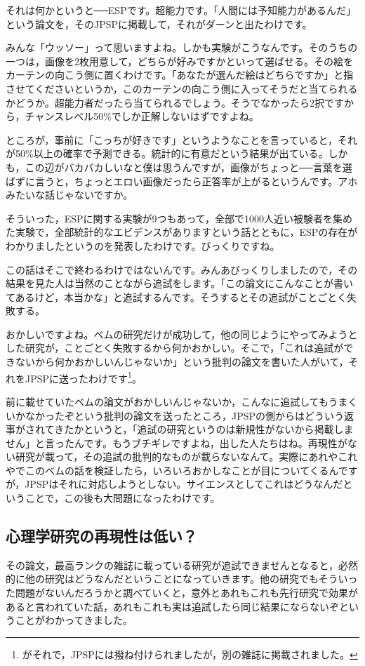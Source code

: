 \documentclass{ltjsbook}
\begin{document}
それは何かというと──ESPです。超能力です。「人間には予知能力があるんだ」という論文を，そのJPSPに掲載して，それがダーンと出たわけです。

みんな「ウッソー」って思いますよね。しかも実験がこうなんです。そのうちの一つは，画像を2枚用意して，どちらが好みですかといって選ばせる。その絵をカーテンの向こう側に置くわけです。「あなたが選んだ絵はどちらですか」と指させてくださいというか，このカーテンの向こう側に入ってそうだと当てられるかどうか。超能力者だったら当てられるでしょう。そうでなかったら2択ですから，チャンスレベル50\%でしか正解しないはずですよね。

ところが，事前に「こっちが好きです」というようなことを言っていると，それが50\%以上の確率で予測できる。統計的に有意だという結果が出ている。しかも，この辺がバカバカしいなと僕は思うんですが，画像がちょっと──言葉を選ばずに言うと，ちょっとエロい画像だったら正答率が上がるというんです。アホみたいな話じゃないですか。

そういった，ESPに関する実験が9つもあって，全部で1000人近い被験者を集めた実験で，全部統計的なエビデンスがありますという話とともに，ESPの存在がわかりましたというのを発表したわけです。びっくりですね。

この話はそこで終わるわけではないんです。みんあびっくりしましたので，その結果を見た人は当然のことながら追試をします。「この論文にこんなことが書いてあるけど，本当かな」と追試するんです。そうするとその追試がことごとく失敗する。

おかしいですよね。ベムの研究だけが成功して，他の同じようにやってみようとした研究が，ことごとく失敗するから何かおかしい。そこで，「これは追試ができないから何かおかしいんじゃないか」という批判の論文を書いた人がいて，それをJPSPに送ったわけです\footnote{\textcite{Ritchie2012}がそれで，JPSPには撥ね付けられましたが，別の雑誌に掲載されました。}。

前に載せていたベムの論文がおかしいんじゃないか，こんなに追試してもうまくいかなかったぞという批判の論文を送ったところ，JPSPの側からはどういう返事がされてきたかというと，「追試の研究というのは新規性がないから掲載しません」と言ったんです。もうブチギレですよね，出した人たちはね。再現性がない研究が載って，その追試の批判的なものが載らないなんて。実際にあれやこれやでこのベムの話を検証したら，いろいろおかしなことが目についてくるんですが，JPSPはそれに対応しようとしない。サイエンスとしてこれはどうなんだということで，この後も大問題になったわけです。

\subsection{心理学研究の再現性は低い？}
その論文，最高ランクの雑誌に載っている研究が追試できませんとなると，必然的に他の研究はどうなんだということになっていきます。他の研究でもそういった問題がないんだろうかと調べていくと，意外とあれもこれも先行研究で効果があると言われていた話，あれもこれも実は追試したら同じ結果にならないぞということがわかってきました。
\end{document}

